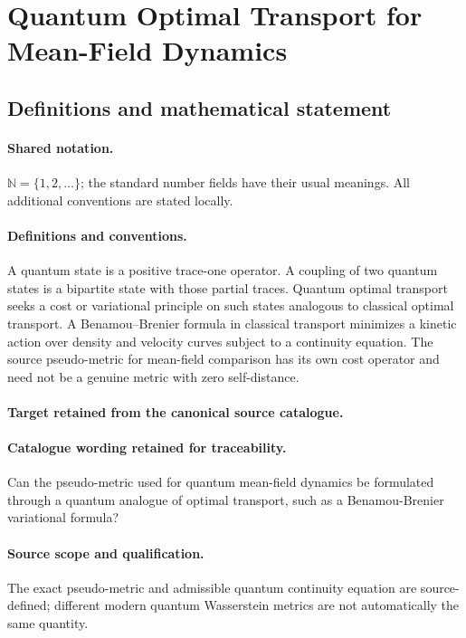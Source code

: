 \documentclass[11pt]{article}
\begin{document}
\section{Quantum Optimal Transport for Mean-Field Dynamics}\label{statement}

\subsection{Definitions and mathematical statement}

\paragraph{Shared notation.}$\mathbb N=\{1,2,\ldots\}$; the standard number fields have their usual meanings. All additional conventions are stated locally.


\paragraph{Definitions and conventions.}
A quantum state is a positive trace-one operator. A coupling of two quantum states is a bipartite state with those partial traces. Quantum optimal transport seeks a cost or variational principle on such states analogous to classical optimal transport. A Benamou--Brenier formula in classical transport minimizes a kinetic action over density and velocity curves subject to a continuity equation. The source pseudo-metric for mean-field comparison has its own cost operator and need not be a genuine metric with zero self-distance.

\paragraph{Target retained from the canonical source catalogue.}
\paragraph{Catalogue wording retained for traceability.}
Can the pseudo-metric used for quantum mean-field dynamics be formulated through a quantum analogue of optimal transport, such as a Benamou-Brenier variational formula?

\paragraph{Source scope and qualification.}
The exact pseudo-metric and admissible quantum continuity equation are source-defined; different modern quantum Wasserstein metrics are not automatically the same quantity.
\end{document}
